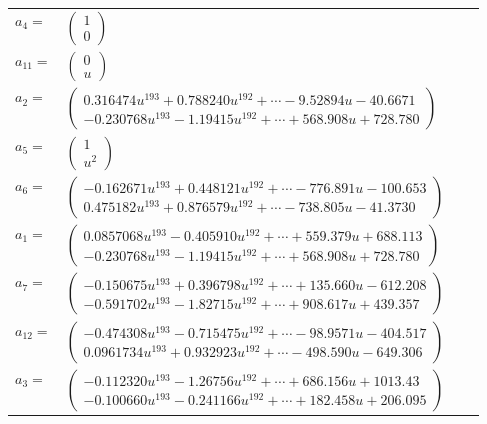 \documentclass[1p]{elsarticle_modified}
\theoremstyle{definition}
\begin{document}
\begin{tabular}{m{7pt} m{180pt} m{7pt} m{180pt} }
\flushright $a_{4}=$&$\begin{pmatrix}1\\0\end{pmatrix}$ \\
\flushright $a_{11}=$&$\begin{pmatrix}0\\u\end{pmatrix}$ \\
\flushright $a_{2}=$&$\begin{pmatrix}0.316474 u^{193}+0.788240 u^{192}+\cdots-9.52894 u-40.6671\\-0.230768 u^{193}-1.19415 u^{192}+\cdots+568.908 u+728.780\end{pmatrix}$ \\
\flushright $a_{5}=$&$\begin{pmatrix}1\\u^2\end{pmatrix}$ \\
\flushright $a_{6}=$&$\begin{pmatrix}-0.162671 u^{193}+0.448121 u^{192}+\cdots-776.891 u-100.653\\0.475182 u^{193}+0.876579 u^{192}+\cdots-738.805 u-41.3730\end{pmatrix}$ \\
\flushright $a_{1}=$&$\begin{pmatrix}0.0857068 u^{193}-0.405910 u^{192}+\cdots+559.379 u+688.113\\-0.230768 u^{193}-1.19415 u^{192}+\cdots+568.908 u+728.780\end{pmatrix}$ \\
\flushright $a_{7}=$&$\begin{pmatrix}-0.150675 u^{193}+0.396798 u^{192}+\cdots+135.660 u-612.208\\-0.591702 u^{193}-1.82715 u^{192}+\cdots+908.617 u+439.357\end{pmatrix}$ \\
\flushright $a_{12}=$&$\begin{pmatrix}-0.474308 u^{193}-0.715475 u^{192}+\cdots-98.9571 u-404.517\\0.0961734 u^{193}+0.932923 u^{192}+\cdots-498.590 u-649.306\end{pmatrix}$ \\
\flushright $a_{3}=$&$\begin{pmatrix}-0.112320 u^{193}-1.26756 u^{192}+\cdots+686.156 u+1013.43\\-0.100660 u^{193}-0.241166 u^{192}+\cdots+182.458 u+206.095\end{pmatrix}$ \\

\end{tabular}
\end{document}
